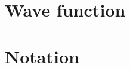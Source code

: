 \documentclass{article}
\begin{document}

\section{Wave function}




\section*{Notation}
\end{document}
